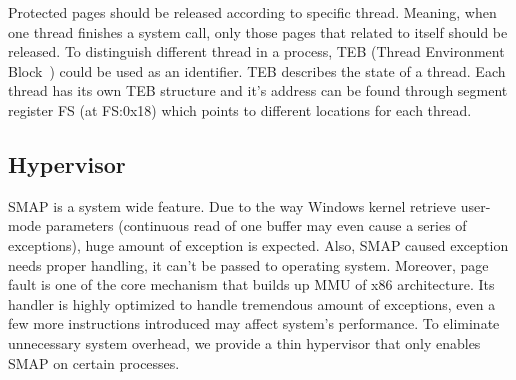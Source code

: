 Protected pages should be released according to specific thread. Meaning, when one thread finishes a system call, only those pages that related to itself should be released. To distinguish different thread in a process, TEB (Thread Environment Block~\cite{teb}) could be used as an identifier. TEB describes the state of a thread. Each thread has its own TEB structure and it's address can be found through segment register FS (at FS:0x18) which points to different locations for each thread. 

\subsection{Hypervisor}

SMAP is a system wide feature. Due to the way Windows kernel retrieve user-mode parameters (continuous read of one buffer may even cause a series of exceptions), huge amount of exception is expected. Also, SMAP caused exception needs proper handling, it can't be passed to operating system. Moreover, page fault is one of the core mechanism that builds up MMU of x86 architecture. Its handler is highly optimized to handle tremendous amount of exceptions, even a few more instructions introduced may affect system's performance.  To eliminate unnecessary system overhead, we provide a thin hypervisor that only enables SMAP on certain processes.

